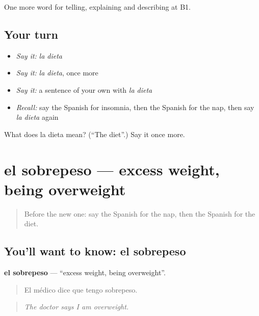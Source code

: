 \begin{grammarlens}[title={What you've built}]
One more word for telling, explaining and describing at B1.
\end{grammarlens}

\subsection*{Your turn}
\begin{itemize}
\raggedright
  \item \emph{Say it:} \emph{la dieta}
  \item \emph{Say it:} \emph{la dieta}, once more
  \item \emph{Say it:} a sentence of your own with \emph{la dieta}
  \item \emph{Recall:} say the Spanish for insomnia, then the Spanish for the nap, then say \emph{la dieta} again
\end{itemize}

\begin{tcolorbox}[breakable,colback=teal!4,colframe=teal!35!black,title={Before you move on}]
What does la dieta mean? (\textquotedblleft{}The diet\textquotedblright{}.) Say it once more.
\end{tcolorbox}
\section[el sobrepeso]{el sobrepeso — excess weight, being overweight}

\label{lesson:ES-C742-sobrepeso}



\begin{quote}
Before the new one: say the Spanish for the nap, then the Spanish for the diet.
\end{quote}

\subsection*{You'll want to know: el sobrepeso}
\textbf{el sobrepeso} — \textquotedblleft{}excess weight, being overweight\textquotedblright{}.

\begin{quote}
El médico dice que tengo sobrepeso.
\end{quote}

\begin{quote}
\emph{The doctor says I am overweight.}
\end{quote}

